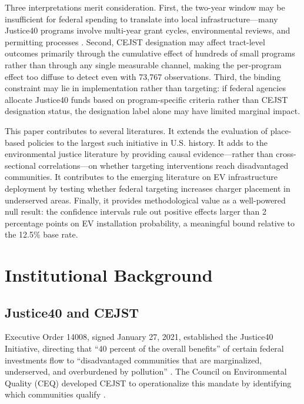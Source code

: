 \documentclass[12pt]{article}
\begin{document}
Three interpretations merit consideration. First, the two-year window may be insufficient for federal spending to translate into local infrastructure---many Justice40 programs involve multi-year grant cycles, environmental reviews, and permitting processes \citep{kline2014people}. Second, CEJST designation may affect tract-level outcomes primarily through the cumulative effect of hundreds of small programs rather than through any single measurable channel, making the per-program effect too diffuse to detect even with 73,767 observations. Third, the binding constraint may lie in implementation rather than targeting: if federal agencies allocate Justice40 funds based on program-specific criteria rather than CEJST designation status, the designation label alone may have limited marginal impact.

This paper contributes to several literatures. It extends the evaluation of place-based policies \citep{kline2014people, busso2013assessing, neumark2013enterprise, depletis2024place} to the largest such initiative in U.S. history. It adds to the environmental justice literature \citep{banzhaf2019environmental, currie2020environmental} by providing causal evidence---rather than cross-sectional correlations---on whether targeting interventions reach disadvantaged communities. It contributes to the emerging literature on EV infrastructure deployment \citep{li2017market, springel2021network, muehlegger2022subsidies} by testing whether federal targeting increases charger placement in underserved areas. Finally, it provides methodological value as a well-powered null result: the confidence intervals rule out positive effects larger than 2 percentage points on EV installation probability, a meaningful bound relative to the 12.5\% base rate.

\section{Institutional Background}

\subsection{Justice40 and CEJST}

Executive Order 14008, signed January 27, 2021, established the Justice40 Initiative, directing that ``40 percent of the overall benefits'' of certain federal investments flow to ``disadvantaged communities that are marginalized, underserved, and overburdened by pollution'' \citep{biden2021eo14008}. The Council on Environmental Quality (CEQ) developed CEJST to operationalize this mandate by identifying which communities qualify \citep{ceq2023}.
\end{document}
